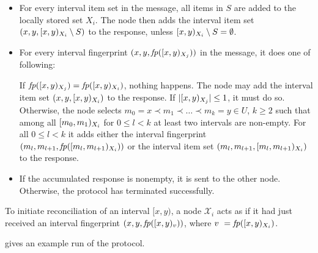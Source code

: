 \begin{itemize}
  \item For every interval item set  in the message, all items in $S$ are added to the locally stored set $X_i$. The node then adds the interval item set $({x}, {y}, {[{x},{y})_{X_i} \setminus S})$ to the response, unless $[{x},{y})_{X_i} \setminus S = \emptyset$.
  \item For every interval fingerprint $({x}, {y}, {\mathit{fp}([{x},{y})_{X_j})})$ in the message, it does one of following:
    \begin{caselist}
       \label{def-fingerprint-eq} If $\mathit{fp}([{x},{y})_{X_j}) = \mathit{fp}([{x},{y})_{X_i})$, nothing happens.
       \label{def-recursion-anchor} The node may add the interval item set $({x}, {y}, [{x},{y})_{X_i})$ to the response. If $|{[{x},{y})_{X_j}}| \leq 1$, it must do so.
      \case[Recurse] \label{def-recurse} Otherwise, the node selects $m_0 = x \prec m_1 \prec \ldots \prec m_k = y \in U$, $k \geq 2$ such that among all $[{m_0},{m_1})_{X_i}$ for  $0 \leq l < k$ at least two intervals are non-empty. For all $0 \leq l < k$ it adds either the interval fingerprint $({m_l}, {m_{l + 1}}, {\mathit{fp}([{m_l},{m_{l + 1}})_{X_i})})$ or the interval item set $({m_l}, {m_{l + 1}}, [{m_l},{m_{l + 1}})_{X_i})$ to the response.
    \end{caselist}
  \item If the accumulated response is nonempty, it is sent to the other node. Otherwise, the protocol has terminated successfully.
\end{itemize}

To initiate reconciliation of an interval $[x, y)$, a node $\mathcal{X}_i$ acts as if it had just received an interval fingerprint $({x}, {y}, {\mathit{fp}([{x},{y})_{v})})$, where $v ~= \mathit{fp}([{x},{y})_{X_i})$.

 gives an example run of the protocol.

